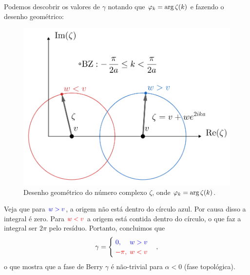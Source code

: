 \documentclass[a4paper,10pt]{article}
\begin{document}
Podemos descobrir os valores de $\gamma$ notando que $\varphi_k = \arg\zeta(k)$ e fazendo o desenho geométrico:
\begin{figure}[H]
\centering
\includegraphics[width=0.7\linewidth]{fig/geogebra.png}
\caption{Desenho geométrico do número complexo $\zeta$, onde $\varphi_k = \arg\zeta(k)$.}
\label{fig:geogebra}
\end{figure}

Veja que para $\textcolor{blue}{w > v}$, a origem não está dentro do círculo azul. Por causa disso a integral é zero. Para $\textcolor{red}{w < v}$ a origem está contida dentro do círculo, o que faz a integral ser $2\pi$ pelo resíduo. Portanto, concluimos que
$$
\gamma =
\begin{cases}
\; \textcolor{blue}{0, \quad \, w > v} \\
\; \textcolor{red}{-\pi, \; w < v}
\end{cases},
$$
o que mostra que a fase de Berry $\gamma$ é não-trivial para $\alpha < 0$ (fase topológica).
\end{document}
